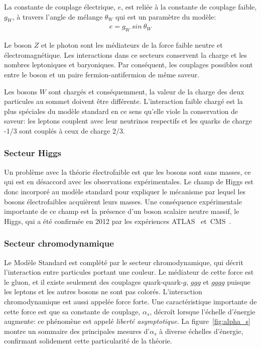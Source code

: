 
La constante de couplage électrique, $e$, est reliée à la constante de
couplage faible, $g_W$, à travers l'angle de mélange $\theta_W$ qui
est un paramètre du modèle: 
\begin{eqnarray}
\label{eq:egw}
  e = g_W\ sin\ \theta_W
\end{eqnarray}

Le boson $Z$ et le photon sont les médiateurs de la force faible
neutre et électromagnétique. Les interactions dans ce secteurs
conservent la charge et les nombres leptoniques et baryoniques. Par
conséquent, les couplages possibles sont entre le boson et un paire
fermion-antifermion de même saveur.

Les bosons $W$ sont chargés et conséquemment, la valeur de la charge
des deux particules au sommet doivent être différente. L'interaction
faible chargé est la plus spéciales du modèle standard en ce sens
qu'elle viole la conservation de saveur: les leptons couplent avec
leur neutrinos respectifs et les quarks de charge -1/3 sont
couplés à ceux de charge 2/3.

\subsubsection{Secteur Higgs}
Un problème avec la théorie électrofaible est que les bosons sont sans
masses, ce qui est en désaccord avec les observations
expérimentales. Le champ de Higgs est donc incorporé au modèle
standard pour expliquer le mécanisme par lequel les bosons
électrofaibles acquièrent leurs masses. Une conséquence expérimentale
importante de ce champ est la présence d'un boson scalaire neutre
massif, le Higgs, qui a été confirmée en 2012 par les expériences
ATLAS~\cite{aad_observation_2012}
et~CMS~\cite{chatrchyan_observation_2012}.

\subsubsection{Secteur chromodynamique}
Le Modèle Standard est complété par le secteur chromodynamique, qui
décrit l'interaction entre particules portant une couleur. Le
médiateur de cette force est le gluon, et il existe seulement des
couplages quark-quark-$g$, $ggg$ et $gggg$ puisque les leptons et les
autres bosons ne sont pas colorés. L'interaction chromodynamique est
aussi appelée force forte. Une caractéristique importante de cette
force est que sa constante de couplage, $\alpha_s$, décroît lorsque
l'échelle d'énergie augmente: ce phénomène est appelé \emph{liberté
  asymptotique}. La figure~\ref{fig:alpha_s} montre un sommaire des
principales mesures d'$\alpha_s$ à diverse échelles d'énergie,
confirmant solidement cette particularité de la théorie.

